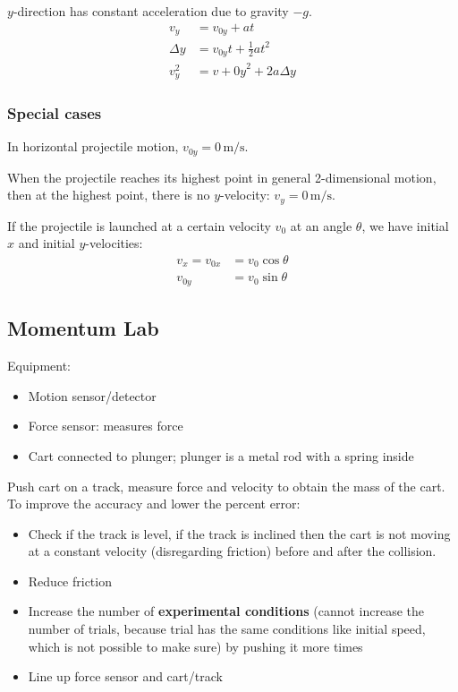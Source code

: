 \documentclass{article}
\begin{document}
$y$-direction has constant acceleration due to gravity $-g$.
\begin{align*}
	v_y&=v_{0y}+at \\
	\Delta y&=v_{0y}t+\frac12at^2 \\
	v_y^2&=v+{0y}^2+2a\Delta y
\end{align*}

\subsubsection{Special cases}

In horizontal projectile motion, $v_{0y}=0\,\si{\meter\per\second}$.

When the projectile reaches its highest point in general 2-dimensional motion, then at the highest point, there is no $y$-velocity: $v_y=0\,\si{\meter\per\second}$.

If the projectile is launched at a certain velocity $v_0$ at an angle $\theta$, we have initial $x$ and initial $y$-velocities:
\begin{align*}
	v_x=v_{0x}&=v_0\cos\theta \\
	v_{0y}&=v_0\sin\theta
\end{align*}

\subsection{Momentum Lab}

Equipment:
\begin{itemize}
	\item Motion sensor/detector
	\item Force sensor: measures force
	\item Cart connected to plunger; plunger is a metal rod with a spring inside
\end{itemize}

Push cart on a track, measure force and velocity to obtain the mass of the cart. To improve the accuracy and lower the percent error:
\begin{itemize}
	\item Check if the track is level, if the track is inclined then the cart is not moving at a constant velocity (disregarding friction) before and after the collision.
	\item Reduce friction
	\item Increase the number of \textbf{experimental conditions} (cannot increase the number of trials, because trial has the same conditions like initial speed, which is not possible to make sure) by pushing it more times
	\item Line up force sensor and cart/track
\end{itemize}
\end{document}
